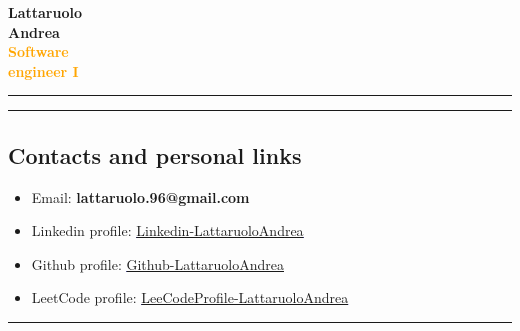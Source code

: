 \documentclass[a4paper,10pt]{article}
\begin{document}
\thispagestyle{empty} %

\noindent
\begin{minipage}[t]{0.25\textwidth}
    \vspace{0.3cm}
    { \LARGE  \textbf{Lattaruolo \\[0.1cm] Andrea \\[0.1cm] \textcolor{orange}{\newline Software \\[0.1cm] engineer I}}} \\[0.5cm]
    \rule{0.6cm}{0.3mm}
\end{minipage}
\hfill
\begin{minipage}[t]{0.75\textwidth}
    \rule{\linewidth}{0.5mm} %
    \subsection*{Contacts and personal links}
    \begin{itemize}[leftmargin=1cm]
        \item Email: \textbf{lattaruolo.96@gmail.com}
        \item Linkedin profile: \textcolor{blue}{\uline\href{https://www.linkedin.com/in/andrea-lattaruolo-64a8a7170}{
        {Linkedin-LattaruoloAndrea}}} 
        \item Github profile: \textcolor{blue}{\uline{\href{https://github.com/LattaruoloAndrea}{Github-LattaruoloAndrea}}}
        \item LeetCode profile: \textcolor{blue}{\uline{\href{https://leetcode.com/u/pierodigia766/}{LeeCodeProfile-LattaruoloAndrea}}}
    \end{itemize}
    \vspace{0.8cm}
    \rule{\linewidth}{0.5mm}
\end{minipage}
\end{document}
